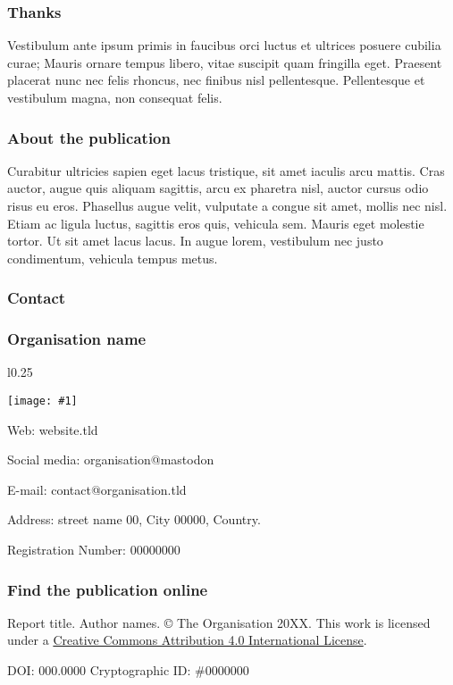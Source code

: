 \documentclass{article}
\newlength{\imgwidth}
\newcommand\scaledgraphics[2]{%
                
\settowidth{\imgwidth}{\texttt{[image: \#1]}}%
                
\setlength{\imgwidth}{\minof{\imgwidth}{#2\textwidth}}%
                
\texttt{[image: \#1]}%
                
}
\begin{document}
\subsubsection{Thanks}\label{H1663104}



Vestibulum ante ipsum primis in faucibus orci luctus et ultrices posuere cubilia curae; Mauris ornare tempus libero, vitae suscipit quam fringilla eget. Praesent placerat nunc nec felis rhoncus, nec finibus nisl pellentesque. Pellentesque et vestibulum magna, non consequat felis.


\subsubsection{About the publication}\label{H6025747}



Curabitur ultricies sapien eget lacus tristique, sit amet iaculis arcu mattis. Cras auctor, augue quis aliquam sagittis, arcu ex pharetra nisl, auctor cursus odio risus eu eros. Phasellus augue velit, vulputate a congue sit amet, mollis nec nisl. Etiam ac ligula luctus, sagittis eros quis, vehicula sem. Mauris eget molestie tortor. Ut sit amet lacus lacus. In augue lorem, vestibulum nec justo condimentum, vehicula tempus metus.


\subsubsection{Contact }\label{H5417875}



\subsubsection{Organisation name}\label{H4140235}


\begin{wrapfigure}{l}{0.25\textwidth}
\scaledgraphics{4d5aeba0-eccd-4039-93f8-6f576dfb284d.png}{0.25}
\label{F76335231}
\end{wrapfigure}











Web: website.tld


Social media: organisation@mastodon


E-mail: contact@organisation.tld


Address: street name 00, City 00000, Country.


Registration Number: 00000000


\subsubsection{Find the publication online}\label{H5096991}



Report title. Author names. © The Organisation 20XX. This work is licensed under a \href{https://creativecommons.org/licenses/by/4.0/}{Creative Commons Attribution 4.0 International License}.


DOI: 000.0000 Cryptographic ID: \#0000000
\end{document}
